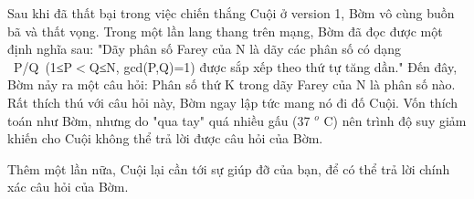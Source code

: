 Sau khi đã thất bại trong việc chiến thắng Cuội ở version 1, Bờm vô cùng buồn bã và thất vọng. Trong một lần lang thang trên mạng, Bờm đã đọc được một định nghĩa sau: "Dãy phân số Farey của N là dãy các phân số có dạng  P/Q (1≤P$<$Q≤N, gcd(P,Q)=1) được sắp xếp theo thứ tự tăng dần." Đến đây, Bờm nảy ra một câu hỏi: Phân số thứ K trong dãy Farey của N là phân số nào.  Rất thích thú với câu hỏi này, Bờm ngay lập tức mang nó đi đố Cuội. Vốn thích toán như Bờm, nhưng do "qua tay" quá nhiều gấu (37   $^    o   $   C) nên trình độ suy giảm khiến cho Cuội không thể trả lời được câu hỏi của Bờm.  

   Thêm một lần nữa, Cuội lại cần tới sự giúp đỡ của bạn, để có thể trả lời chính xác câu hỏi của Bờm.  

\
